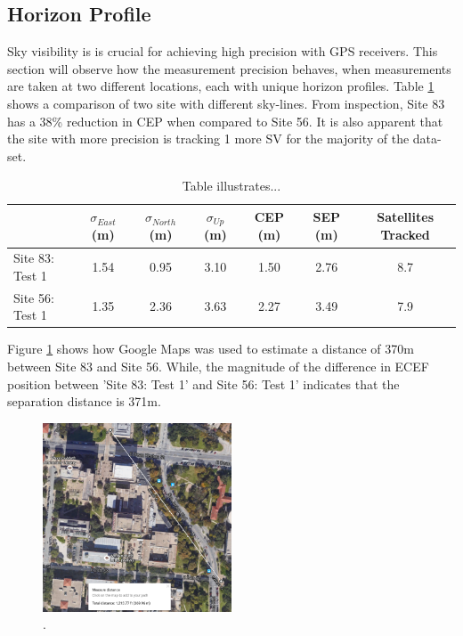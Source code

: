 \documentclass[11pt]{article}
\begin{document}
\subsection{Horizon Profile}

Sky visibility is is crucial for achieving high precision with GPS receivers. This section will observe how the measurement precision behaves, when measurements are taken at two different locations, each with unique horizon profiles. Table \ref{tab:horizon} shows a comparison of two site with different sky-lines. From inspection, Site 83 has a 38\% reduction in CEP when compared to Site 56. It is also apparent that the site with more precision is tracking 1 more SV for the majority of the data-set.

\begin{table}[h!]
\begin{center}
    \begin{tabular}{  l || c | c | c | c | c | c | }
  & $\sigma_{East}$ (m) & $\sigma_{North}$ (m) & $\sigma_{Up}$ (m) & CEP (m) & SEP (m) & Satellites Tracked \\\hline
  \hline
Site 83: Test 1 &  1.54  & 0.95 &  3.10 & 1.50 & 2.76 & 8.7 \\\hline
Site 56: Test 1 &  1.35  & 2.36 &  3.63 & 2.27 & 3.49 & 7.9 \\\hline
    \end{tabular}
\caption{Table illustrates...}
\label{tab:horizon}
\end{center}
\end{table}

Figure \ref{fig:googleMaps} shows how Google Maps was used to estimate a distance of 370m between Site 83 and Site 56. While, the magnitude of the difference in ECEF position between 'Site 83: Test 1' and Site 56: Test 1' indicates that the separation distance is 371m.

\begin{figure}[h]
\begin{center}
\includegraphics[width=0.5\textwidth]{googleMaps}
\end{center}
\caption{.}
\label{fig:googleMaps}
\end{figure}
\end{document}
